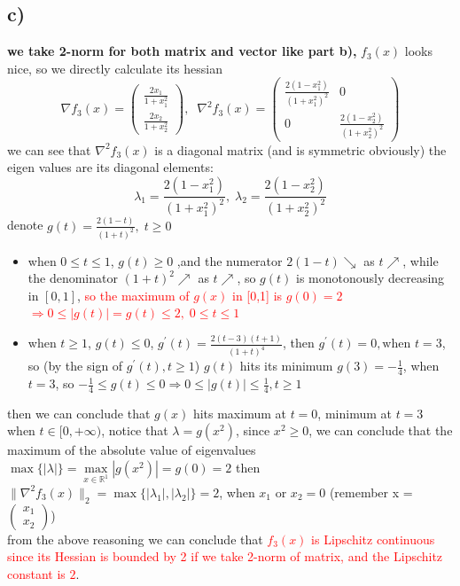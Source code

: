 \documentclass{article}
\newcommand{\subs}[1]{\subsection*{#1}}
\begin{document}
\subs{c)}
\textbf{we take 2-norm for both matrix and vector like part b), }$f_3(x)$ looks nice, so we directly calculate its hessian
\[
\nabla f_3(x)=\begin{pmatrix}\displaystyle
    \frac{2x_1}{1+x_1^2}\\
    \displaystyle \frac{2x_2}{1+x_2^2}
\end{pmatrix},\;\;
\nabla^2 f_3(x) = \begin{pmatrix}\displaystyle
    \frac{2(1-x_1^2)}{(1+x_1^2)^2} & 0\\
    \displaystyle 0 &\displaystyle  \frac{2(1-x_2^2)}{(1+x_2^2)^2}
\end{pmatrix}
\]
we can see that $\nabla^2 f_3(x)$ is a diagonal matrix (and is symmetric obviously) the eigen values are its diagonal elements: 
\[
\lambda_1 = \frac{2(1-x_1^2)}{(1+x_1^2)^2},\; \lambda_2 = \frac{2(1-x_2^2)}{(1+x_2^2)^2}
\]
denote $\displaystyle g(t) = \frac{2(1-t)}{(1+t)^2},\; t \geq 0$\begin{itemize}
    \item when $0 \leq t \leq 1$, $g(t)\geq 0$ ,and the numerator $2(1-t) \searrow  $ as $t \nearrow$, while the denominator $(1+t)^2 \nearrow $ as $t \nearrow$, so $g(t)$ is monotonously decreasing in $[0,1]$, \textcolor{red}{so the maximum of $g(x)$ in [0,1] is $g(0) = 2$ $\Rightarrow 0\leq |g(t)| = g(t)\leq 2,\; 0\leq t \leq 1$}
    \item when $t\geq 1$, $g(t)\leq 0$, $\displaystyle g^\prime (t) = \frac{2(t-3)(t+1)}{(1+t)^4}$, then $g^\prime (t)=0, \text{when }t=3$, so (by the sign of $g^\prime (t), t \geq 1$) $g(t)$ hits its minimum $g(3) = -\frac{1}{4}$, when $t=3$, so $-\frac{1}{4}\leq g(t) \leq 0 \Rightarrow 0 \leq|g(t)|\leq \frac{1}{4}, t\geq 1$
\end{itemize}
then we can conclude that $g(x)$ hits maximum at $t=0$, minimum at $t=3$ when $t \in [0,+\infty)$, notice that $\displaystyle \lambda = g(x^2)$, since $x^2\geq 0$, we can conclude that the maximum of the absolute value of eigenvalues $\max \{|\lambda|\} = \underset{x\in \mathbb{R}^1}{\max}|g(x^2)| = g(0) = 2$
then $\|\nabla^2 f_3(x)\|_2 = \max{\{|\lambda_1|,|\lambda_2|\}} = 2$, when $x_1\text{ or } x_2 = 0$ (remember x = $\begin{pmatrix}
    x_1\\
    x_2
\end{pmatrix}$)\\
from the above reasoning we can conclude that \textcolor{red}{$f_3(x)$ is Lipschitz continuous since its Hessian is bounded by 2 if we take 2-norm of matrix, and the Lipschitz constant is $2$}.
\end{document}
